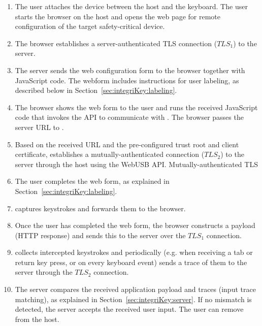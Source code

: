 \begin{enumerate}
    \item[\one] The user attaches the \device device between the host and the keyboard. The user starts the browser on the host and opens the web page for remote configuration of the target safety-critical device. 

    \item[\two] The browser establishes a server-authenticated TLS connection ($TLS_1$) to the server. 

    \item[\three] The server sends the web configuration form to the browser together with JavaScript code. The webform includes instructions for user labeling, as described below in Section~\ref{sec:integriKey:labeling}.
    
    \item[\four] The browser shows the web form to the user and runs the received JavaScript code that invokes the \webusb API to communicate with \device. The browser passes the server URL to \device.

    \item[\five] Based on the received URL and the pre-configured trust root and client certificate, \device establishes a mutually-authenticated \tls connection ($TLS_2$) to the server through the host using the WebUSB API. Mutually-authenticated TLS 

    \item[\six] The user completes the web form, as explained in Section~\ref{sec:integriKey:labeling}.
    
    \item[\seven] \device captures keystrokes and forwards them to the browser.
    
    \item[\eight] Once the user has completed the web form, the browser constructs a payload (HTTP response) and sends this to the server over the $TLS_1$ connection.
    
    \item[\nine] \device collects intercepted keystrokes and periodically (e.g. when receiving a tab or return key press, or on every keyboard event) sends a trace of them to the server through the $TLS_2$ connection. 

    \item[\ten] The server compares the received application payload and traces (input trace matching), as explained in Section~\ref{sec:integriKey:server}. If no mismatch is detected, the server accepts the received user input. The user can remove \device from the host.
\end{enumerate}

